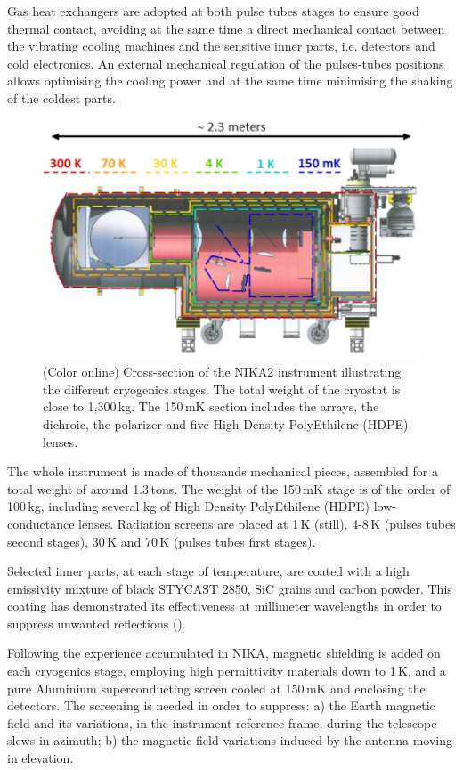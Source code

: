 \documentclass[]{aa} %
\begin{document}
Gas heat exchangers are adopted at both pulse tubes stages to ensure good thermal contact, avoiding at the same time a direct mechanical contact between the vibrating cooling machines and the sensitive inner parts, i.e. detectors and cold electronics. An external mechanical regulation of the pulses-tubes positions allows optimising the cooling power and at the same time minimising the shaking of the coldest parts. 

\begin{figure}[h]
   \centering
   \includegraphics[width=.95\linewidth]{NIKA2_cryoStages.png}
      \caption{(Color online) Cross-section of the NIKA2 instrument illustrating the different cryogenics stages. The total weight of the cryostat is close to 1,300\,kg. The 150\,mK section includes the arrays, the dichroic, the polarizer and five High Density PolyEthilene (HDPE) lenses.}
         \label{Cryostat_cryo}
\end{figure}

The whole instrument is made of thousands mechanical pieces, assembled for a total weight of around 1.3\,tons. The weight of the 150\,mK stage is of the order of 100\,kg, including several kg of High Density PolyEthilene (HDPE) low-conductance lenses. Radiation screens are placed at 1\,K (still), 4-8\,K (pulses tubes second stages), 30\,K and 70\,K (pulses tubes first stages).

Selected inner parts, at each stage of temperature, are coated with a high emissivity mixture of black STYCAST 2850, SiC grains and carbon powder. This coating has demonstrated its effectiveness at millimeter wavelengths in order to suppress unwanted reflections (\cite{Calvo2010}).

Following the experience accumulated in NIKA, magnetic shielding is added on each cryogenics stage, employing high permittivity materials down to 1\,K, and a pure Aluminium superconducting screen cooled at 150\,mK and enclosing the detectors. The screening is needed in order to suppress: a) the Earth magnetic field and its variations, in the instrument reference frame, during the telescope slews in azimuth; b) the magnetic field variations induced by the antenna moving in elevation. 
\end{document}

